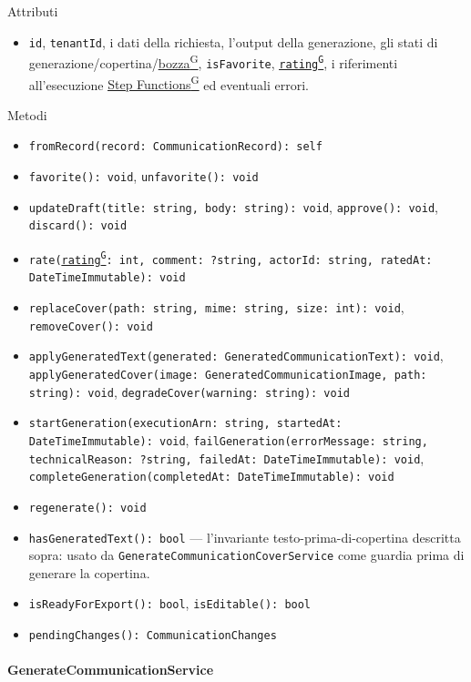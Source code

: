 \documentclass[a4paper,12pt]{article}
\providecommand{\glslink}[2]{\href{https://alittlebyte-19.github.io/Documentazione/glossario.html\#gls-#1}{\underline{#2}\textsuperscript{\scriptsize G}}}
\begin{document}
\begin{sloppypar}
Attributi
\begin{itemize}\raggedright
    \item \texttt{id}, \texttt{tenantId}, i dati della richiesta, l'output della generazione, gli stati di generazione/copertina/\glslink{bozza-draft}{bozza}, \texttt{isFavorite}, \texttt{\glslink{rating}{rating}}, i riferimenti all'esecuzione \glslink{step-functions}{Step Functions} ed eventuali errori.
\end{itemize}

Metodi
\begin{itemize}\raggedright
    \item \texttt{fromRecord(record: CommunicationRecord): self}
    \item \texttt{favorite(): void}, \texttt{unfavorite(): void}
    \item \texttt{updateDraft(title: string, body: string): void}, \texttt{approve(): void}, \texttt{discard(): void}
    \item \texttt{rate(\glslink{rating}{rating}: int, comment: ?string, actorId: string, ratedAt: DateTimeImmutable): void}
    \item \texttt{replaceCover(path: string, mime: string, size: int): void}, \texttt{removeCover(): void}
    \item \texttt{applyGeneratedText(generated: GeneratedCommunicationText): void}, \texttt{applyGeneratedCover(image: GeneratedCommunicationImage, path: string): void}, \texttt{degradeCover(warning: string): void}
    \item \texttt{startGeneration(executionArn: string, startedAt: DateTimeImmutable): void}, \texttt{failGeneration(errorMessage: string, technicalReason: ?string, failedAt: DateTimeImmutable): void}, \texttt{completeGeneration(completedAt: DateTimeImmutable): void}
    \item \texttt{regenerate(): void}
    \item \texttt{hasGeneratedText(): bool} --- l'invariante testo-prima-di-copertina descritta sopra: usato da \texttt{GenerateCommunicationCoverService} come guardia prima di generare la copertina.
    \item \texttt{isReadyForExport(): bool}, \texttt{isEditable(): bool}
    \item \texttt{pendingChanges(): CommunicationChanges}
\end{itemize}

\paragraph{GenerateCommunicationService}


\end{sloppypar}
\end{document}
